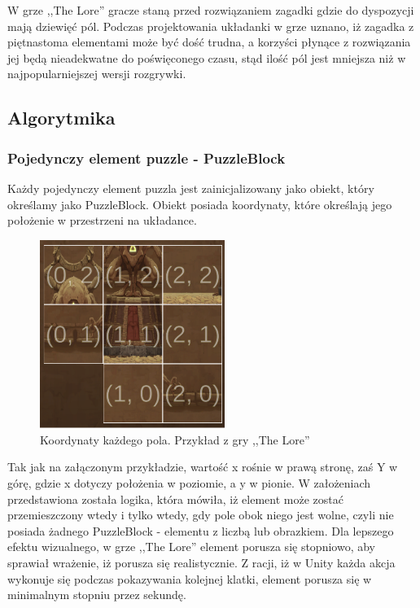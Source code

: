 \documentclass[oneside,polski,logo]{amuthesis}
\begin{document}
W grze ,,The Lore'' gracze staną przed rozwiązaniem zagadki gdzie do dyspozycji mają dziewięć pól. Podczas projektowania układanki w grze uznano, iż zagadka z piętnastoma elementami może być dość trudna, a korzyści płynące z rozwiązania jej będą nieadekwatne do poświęconego czasu, stąd ilość pól jest mniejsza niż w najpopularniejszej wersji rozgrywki.
\subsection{Algorytmika}
\subsubsection{Pojedynczy element puzzle - PuzzleBlock}

\par Każdy pojedynczy element puzzla jest zainicjalizowany jako obiekt, który określamy jako PuzzleBlock. Obiekt posiada koordynaty, które określają jego położenie w przestrzeni na układance.

\begin{figure}[h]
	\centering
	\includegraphics[width=6cm]{images/tyrek/coord_puzzle.png}
	\caption{Koordynaty każdego pola. Przykład z gry ,,The Lore''}
\end{figure}

Tak jak na załączonym przykładzie, wartość x rośnie w prawą stronę, zaś Y w górę, gdzie x dotyczy położenia w poziomie, a y w pionie. W założeniach przedstawiona została logika, która mówiła, iż element może zostać przemieszczony wtedy i tylko wtedy, gdy pole obok niego jest wolne, czyli nie posiada żadnego PuzzleBlock - elementu z liczbą lub obrazkiem. Dla lepszego efektu wizualnego, w grze ,,The Lore'' element porusza się stopniowo, aby sprawiał wrażenie, iż porusza się realistycznie. Z racji, iż w Unity każda akcja wykonuje się podczas pokazywania kolejnej klatki, element porusza się w minimalnym stopniu przez sekundę. 
\end{document}
